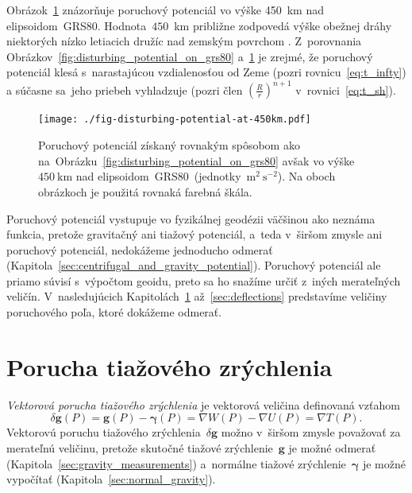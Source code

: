 \documentclass[a4paper, 12pt]{book}
\let\vec\mathbf
\begin{document}
Obrázok~\ref{fig:disturbing_potential_at_450km} znázorňuje poruchový potenciál 
vo výške 450~km nad elipsoidom~GRS80.  Hodnota~$450$~km približne zodpovedá 
výške obežnej dráhy niektorých nízko letiacich družíc nad zemským povrchom 
\parencite[pozri napríklad][]{MoritzPhysicalGeodesy}.  Z~porovnania 
Obrázkov~\ref{fig:disturbing_potential_on_grs80} 
a~\ref{fig:disturbing_potential_at_450km} je zrejmé, že poruchový potenciál 
klesá s~narastajúcou vzdialenosťou od Zeme (pozri rovnicu~\ref{eq:t_infty}) 
a súčasne sa~jeho priebeh vyhladzuje (pozri člen $\left( \frac{R}{r} \right)^{n 
+ 1}$ v~rovnici~\ref{eq:t_sh}).

\begin{figure}
\centering
\texttt{[image: ./fig-disturbing-potential-at-450km.pdf]}
\caption{Poruchový potenciál získaný rovnakým spôsobom ako 
na~Obrázku~\ref{fig:disturbing_potential_on_grs80} avšak vo výške~$450\ 
\mathrm{km}$ nad elipsoidom~GRS80~(jednotky~$\mathrm{m}^2 \ \mathrm{s}^{-2}$).  
Na oboch obrázkoch je použitá rovnaká farebná škála.}
\label{fig:disturbing_potential_at_450km}
\end{figure}

Poruchový potenciál vystupuje vo fyzikálnej geodézii väčšinou ako neznáma 
funkcia, pretože gravitačný ani tiažový potenciál, a~teda v~širšom zmysle ani 
poruchový potenciál, nedokážeme jednoducho odmerať 
(Kapitola~\ref{sec:centrifugal_and_gravity_potential}).  Poruchový potenciál 
ale priamo súvisí s~výpočtom geoidu, preto sa ho snažíme určiť z~iných 
merateľných veličín.  V~nasledujúcich Kapitolách~\ref{sec:gravity_disturbance} 
až~\ref{sec:deflections} predstavíme veličiny poruchového poľa, ktoré dokážeme 
odmerať.





\section{Porucha tiažového zrýchlenia}
\label{sec:gravity_disturbance}

\emph{Vektorová porucha tiažového zrýchlenia} je vektorová veličina definovaná 
vzťahom
%
\begin{equation}
\label{eq:dg_vector}
\delta \vec g(P) = \vec g(P) - \boldsymbol \gamma(P) = \nabla W(P) - \nabla 
U(P) = \nabla T(P){.}
\end{equation}
%
Vektorovú poruchu tiažového zrýchlenia~$\delta \vec g$ možno v~širšom zmysle 
považovať za merateľnú veličinu, pretože skutočné tiažové zrýchlenie~$\vec g$ 
je možné odmerať (Kapitola~\ref{sec:gravity_measurements}) a~normálne tiažové 
zrýchlenie~$\boldsymbol\gamma$ je možné vypočítať 
(Kapitola~\ref{sec:normal_gravity}).
\end{document}
